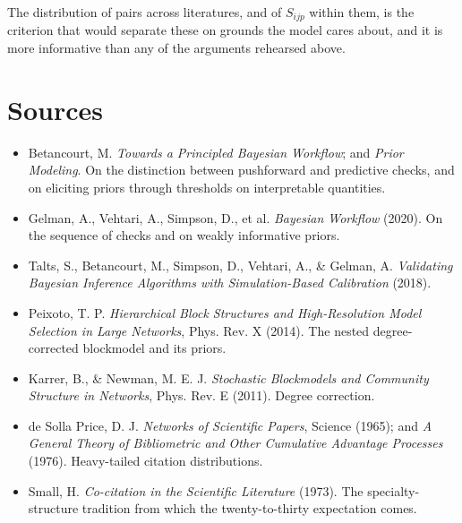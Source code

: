 \documentclass[11pt]{article}
\begin{document}
The distribution of pairs across literatures, and of $S_{ijp}$ within them,
is the criterion that would separate these on grounds the model cares about,
and it is more informative than any of the arguments rehearsed above.

\section*{Sources}

\begin{itemize}[leftmargin=1.5em, itemsep=0.25em]
\item Betancourt, M. \emph{Towards a Principled Bayesian Workflow}; and
  \emph{Prior Modeling}. On the distinction between pushforward and predictive
  checks, and on eliciting priors through thresholds on interpretable
  quantities.
\item Gelman, A., Vehtari, A., Simpson, D., et al. \emph{Bayesian Workflow}
  (2020). On the sequence of checks and on weakly informative priors.
\item Talts, S., Betancourt, M., Simpson, D., Vehtari, A., \& Gelman, A.
  \emph{Validating Bayesian Inference Algorithms with Simulation-Based
  Calibration} (2018).
\item Peixoto, T. P. \emph{Hierarchical Block Structures and High-Resolution
  Model Selection in Large Networks}, Phys. Rev. X (2014). The nested
  degree-corrected blockmodel and its priors.
\item Karrer, B., \& Newman, M. E. J. \emph{Stochastic Blockmodels and Community
  Structure in Networks}, Phys. Rev. E (2011). Degree correction.
\item de Solla Price, D. J. \emph{Networks of Scientific Papers}, Science
  (1965); and \emph{A General Theory of Bibliometric and Other Cumulative
  Advantage Processes} (1976). Heavy-tailed citation distributions.
\item Small, H. \emph{Co-citation in the Scientific Literature} (1973). The
  specialty-structure tradition from which the twenty-to-thirty expectation
  comes.
\end{itemize}
\end{document}
